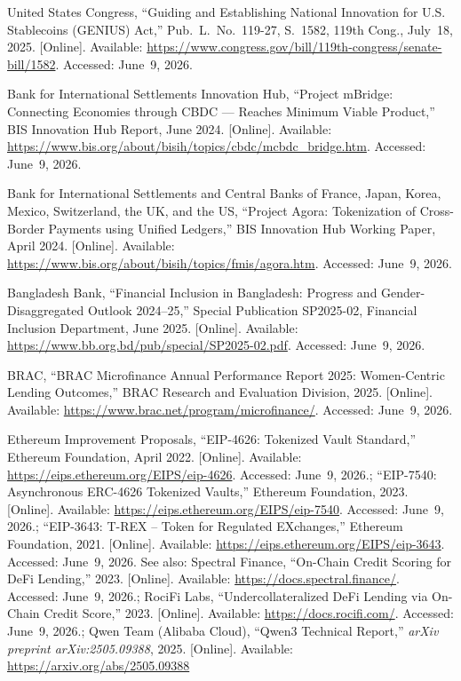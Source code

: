 \documentclass[12pt, a4paper]{report}
\begin{document}
{\begin{enumerate}[label={[\arabic*]}]
\item United States Congress, ``Guiding and Establishing National Innovation for U.S. Stablecoins (GENIUS) Act,'' Pub.~L.~No.~119-27, S.~1582, 119th Cong., July~18, 2025. [Online]. Available: \url{https://www.congress.gov/bill/119th-congress/senate-bill/1582}. Accessed: June~9, 2026.

\item Bank for International Settlements Innovation Hub, ``Project mBridge: Connecting Economies through CBDC --- Reaches Minimum Viable Product,'' BIS Innovation Hub Report, June 2024. [Online]. Available: \url{https://www.bis.org/about/bisih/topics/cbdc/mcbdc_bridge.htm}. Accessed: June~9, 2026.

\item Bank for International Settlements and Central Banks of France, Japan, Korea, Mexico, Switzerland, the UK, and the US, ``Project Agora: Tokenization of Cross-Border Payments using Unified Ledgers,'' BIS Innovation Hub Working Paper, April 2024. [Online]. Available: \url{https://www.bis.org/about/bisih/topics/fmis/agora.htm}. Accessed: June~9, 2026.

\item Bangladesh Bank, ``Financial Inclusion in Bangladesh: Progress and Gender-Disaggregated Outlook 2024--25,'' Special Publication SP2025-02, Financial Inclusion Department, June 2025. [Online]. Available: \url{https://www.bb.org.bd/pub/special/SP2025-02.pdf}. Accessed: June~9, 2026.

\item BRAC, ``BRAC Microfinance Annual Performance Report 2025: Women-Centric Lending Outcomes,'' BRAC Research and Evaluation Division, 2025. [Online]. Available: \url{https://www.brac.net/program/microfinance/}. Accessed: June~9, 2026.

\item Ethereum Improvement Proposals, ``EIP-4626: Tokenized Vault Standard,'' Ethereum Foundation, April 2022. [Online]. Available: \url{https://eips.ethereum.org/EIPS/eip-4626}. Accessed: June~9, 2026.; ``EIP-7540: Asynchronous ERC-4626 Tokenized Vaults,'' Ethereum Foundation, 2023. [Online]. Available: \url{https://eips.ethereum.org/EIPS/eip-7540}. Accessed: June~9, 2026.; ``EIP-3643: T-REX -- Token for Regulated EXchanges,'' Ethereum Foundation, 2021. [Online]. Available: \url{https://eips.ethereum.org/EIPS/eip-3643}. Accessed: June~9, 2026. See also: Spectral Finance, ``On-Chain Credit Scoring for DeFi Lending,'' 2023. [Online]. Available: \url{https://docs.spectral.finance/}. Accessed: June~9, 2026.; RociFi Labs, ``Undercollateralized DeFi Lending via On-Chain Credit Score,'' 2023. [Online]. Available: \url{https://docs.rocifi.com/}. Accessed: June~9, 2026.; Qwen Team (Alibaba Cloud), ``Qwen3 Technical Report,'' \textit{arXiv preprint arXiv:2505.09388}, 2025. [Online]. Available: \url{https://arxiv.org/abs/2505.09388}


\end{enumerate}}
\end{document}
